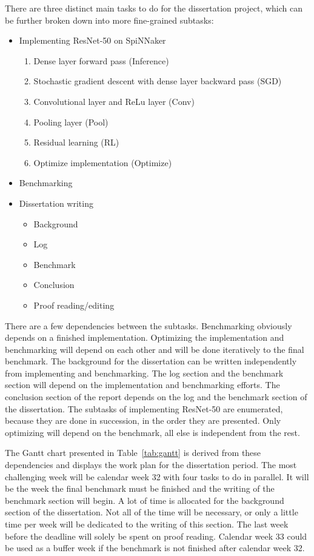 \documentclass{article}
\begin{document}
There are three distinct main tasks to do for the
dissertation project, which can be further broken
down into more fine-grained subtasks:
\begin{itemize}
  \item Implementing ResNet-50 on SpiNNaker
    \begin{enumerate}
      \item Dense layer forward pass (Inference)
        \citep[see][]{goodfellow2016}
      \item Stochastic gradient descent with dense layer
        backward pass (SGD) \citep[see][]{goodfellow2016}
      \item Convolutional layer and ReLu layer (Conv)
        \citep[see][]{goodfellow2016}
      \item Pooling layer (Pool)
        \citep[see][]{goodfellow2016}
      \item Residual learning (RL)
        \citep[see][]{he_et_al_2015}
      \item Optimize implementation (Optimize)
    \end{enumerate}
  \item Benchmarking
  \item Dissertation writing
    \begin{itemize}
      \item Background
      \item Log
      \item Benchmark
      \item Conclusion
      \item Proof reading/editing
    \end{itemize}
\end{itemize}
There are a few dependencies between the subtasks.
Benchmarking obviously depends on a finished
implementation.
Optimizing the implementation and benchmarking will depend
on each other and will be done iteratively to the final
benchmark.
The background for the dissertation can be written
independently from implementing and benchmarking.
The log section and the benchmark section will depend on
the implementation and benchmarking efforts.
The conclusion section of the report depends on the log and
the benchmark section of the dissertation.
The subtasks of implementing ResNet-50 are enumerated,
because they are done in succession, in the order they
are presented.
Only optimizing will depend on the benchmark, all else is
independent from the rest.

The Gantt chart presented in Table~\ref{tab:gantt} is
derived from these dependencies and displays the work plan
for the dissertation period.
The most challenging week will be calendar week 32 with
four tasks to do in parallel.
It will be the week the final benchmark must be finished
and the writing of the benchmark section will begin.
A lot of time is allocated for the background section of the
dissertation.
Not all of the time will be necessary, or only a little
time per week will be dedicated to the writing of this
section.
The last week before the deadline will solely be spent on
proof reading.
Calendar week 33 could be used as a buffer week if
the benchmark is not finished after calendar week 32.
\end{document}
